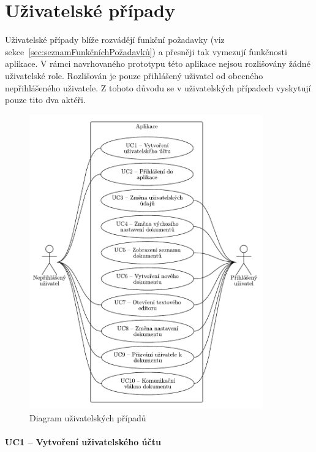 \section{Uživatelské případy}\label{sec:uzivatelskePripady}

Uživatelské případy blíže rozvádějí funkční požadavky (viz sekce~\ref{sec:seznamFunkčníchPožadavků}) a přesněji tak vymezují funkčnosti aplikace.
V rámci navrhovaného prototypu této aplikace nejsou rozlišovány žádné uživatelské role.
Rozlišován je pouze přihlášený uživatel od obecného nepřihlášeného uživatele.
Z tohoto důvodu se v uživatelských případech vyskytují pouze tito dva aktéři.

\begin{figure}[ht!]
    \centering
    \includegraphics[width=0.9\textwidth]{partials/analyza/useCases.pdf}
    \caption{Diagram uživatelských případů}\label{fig:useCases}
\end{figure}


\paragraph{UC1 -- Vytvoření uživatelského účtu}

